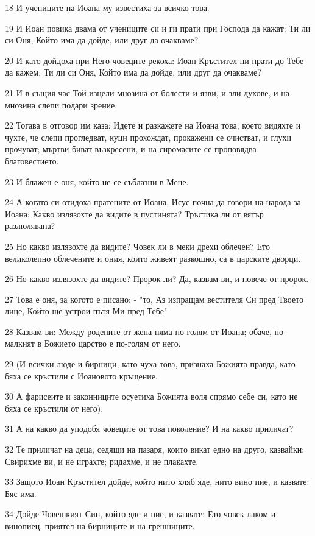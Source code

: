 \par 18 И учениците на Иоана му известиха за всичко това.
\par 19 И Иоан повика двама от учениците си и ги прати при Господа да кажат: Ти ли си Оня, Който има да дойде, или друг да очакваме?
\par 20 И като дойдоха при Него човеците рекоха: Иоан Кръстител ни прати до Тебе да кажем: Ти ли си Оня, Който има да дойде, или друг да очакваме?
\par 21 И в същия час Той изцели мнозина от болести и язви, и зли духове, и на мнозина слепи подари зрение.
\par 22 Тогава в отговор им каза: Идете и разкажете на Иоана това, което видяхте и чухте, че слепи прогледват, куци прохождат, прокажени се очистват, и глухи прочуват; мъртви биват възкресени, и на сиромасите се проповядва благовестието.
\par 23 И блажен е оня, който не се съблазни в Мене.
\par 24 А когато си отидоха пратените от Иоана, Исус почна да говори на народа за Иоана: Какво излязохте да видите в пустинята? Тръстика ли от вятър разлюлявана?
\par 25 Но какво излязохте да видите? Човек ли в меки дрехи облечен? Ето великолепно облечените и ония, които живеят разкошно, са в царските дворци.
\par 26 Но какво излязохте да видите? Пророк ли? Да, казвам ви, и повече от пророк.
\par 27 Това е оня, за когото е писано: - "то, Аз изпращам вестителя Си пред Твоето лице, Който ще устрои пътя Ми пред Тебе"
\par 28 Казвам ви: Между родените от жена няма по-голям от Иоана; обаче, по-малкият в Божието царство е по-голям от него.
\par 29 (И всички люде и бирници, като чуха това, признаха Божията правда, като бяха се кръстили с Иоановото кръщение.
\par 30 А фарисеите и законниците осуетиха Божията воля спрямо себе си, като не бяха се кръстили от него).
\par 31 А на какво да уподобя човеците от това поколение? И на какво приличат?
\par 32 Те приличат на деца, седящи на пазаря, които викат едно на друго, казвайки: Свирихме ви, и не играхте; ридахме, и не плакахте.
\par 33 Защото Иоан Кръстител дойде, който нито хляб яде, нито вино пие, и казвате: Бяс има.
\par 34 Дойде Човешкият Син, който яде и пие, и казвате: Ето човек лаком и винопиец, приятел на бирниците и на грешниците.
